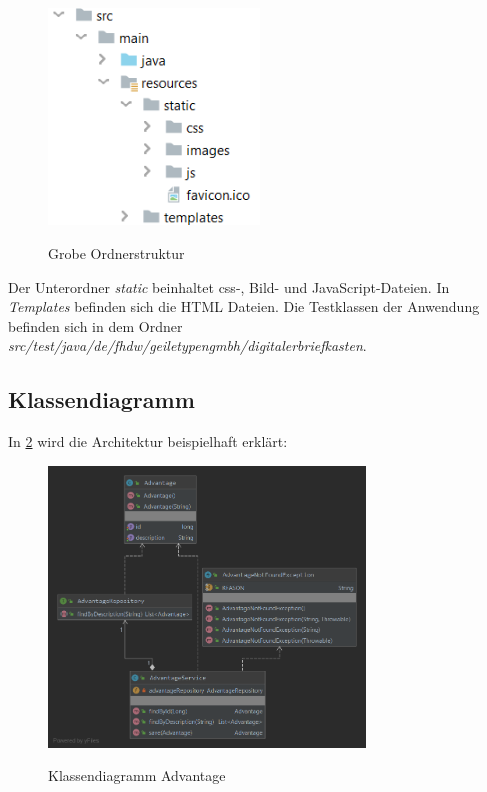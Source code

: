 \begin{figure}[htb]
    \centering
    \begin{minipage}[H]{1\textwidth}
        \caption{Grobe Ordnerstruktur}
        \includegraphics[width=0.5\textwidth]{img/resources-ordner.png}\\
        \label{fig:resources-ordner}
    \end{minipage}
\end{figure}

Der Unterordner \textit{static} beinhaltet css-, Bild- und JavaScript-Dateien. In \textit{Templates} befinden sich die HTML Dateien.
Die Testklassen der Anwendung befinden sich in dem Ordner \textit{src/test/java/de/fhdw/geiletypengmbh/digitalerbriefkasten}.

\subsection{Klassendiagramm}
In \cref{fig:advantage-klassendiagramm} wird die Architektur beispielhaft erklärt:

\begin{figure}[htb]
    \centering
    \begin{minipage}[H]{1\textwidth}
        \caption{Klassendiagramm Advantage}
        \includegraphics[width=0.75\textwidth]{img/advantage-klassendiagramm.png}\\
        \label{fig:advantage-klassendiagramm}
    \end{minipage}
\end{figure}

